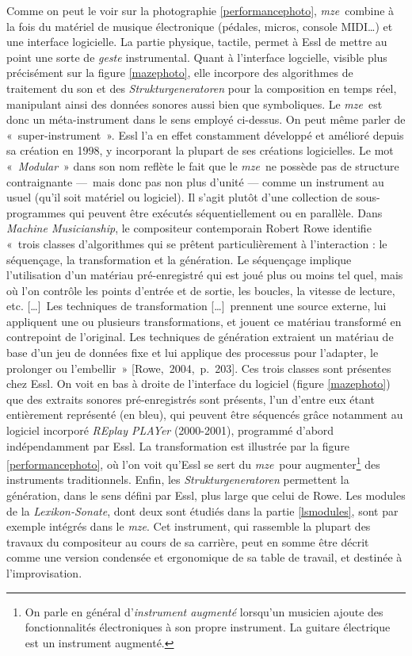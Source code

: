 \documentclass[a4paper,12pt]{article}
\newcommand{\guill}[1]{«~#1~»}
\newcommand{\maze}[0]{\emph{m\symbol{64}ze\textdegree2}}
\newcommand{\tpp}[0]{[\dots]}
\newcommand{\cicite}[1]{{\footnotesize[#1]}}
\begin{document}
Comme on peut le voir sur la photographie \ref{performancephoto}, \maze~combine à la fois du matériel de musique électronique (pédales, micros, console MIDI\dots) et une interface logicielle. La partie physique, tactile, permet à Essl de mettre au point une sorte de \emph{geste} instrumental. Quant à l'interface logcielle, visible plus précisément sur la figure \ref{mazephoto}, elle incorpore des algorithmes de traitement du son et des \emph{Strukturgeneratoren} pour la composition en temps réel, manipulant ainsi des données sonores aussi bien que symboliques. Le \maze~est donc un méta-instrument dans le sens employé ci-dessus. On peut même parler de \guill{super-instrument}. Essl l'a en effet constamment développé et amélioré depuis sa création en 1998, y incorporant la plupart de ses créations logicielles. Le mot \guill{\emph{Modular}} dans son nom reflète le fait que le \maze~ne possède pas de structure contraignante ---~mais donc pas non plus d'unité --- comme un instrument au usuel (qu'il soit matériel ou logiciel). Il s'agit plutôt d'une collection de sous-programmes qui peuvent être exécutés séquentiellement ou en parallèle. Dans \emph{Machine Musicianship}, le compositeur contemporain Robert Rowe identifie \guill{trois classes d'algorithmes qui se prêtent particulièrement à l'interaction : le séquençage, la transformation et la génération. Le séquençage implique l'utilisation d'un matériau pré-enregistré qui est joué plus ou moins tel quel, mais où l'on contrôle les points d'entrée et de sortie, les boucles, la vitesse de lecture, etc. \tpp~Les techniques de transformation \tpp~prennent une source externe, lui appliquent une ou plusieurs transformations, et jouent ce matériau transformé en contrepoint de l'original. Les techniques de génération extraient un matériau de base d'un jeu de données fixe et lui applique des processus pour l'adapter, le prolonger ou l'embellir} \cicite{Rowe,~2004,~p.~203}. Ces trois classes sont présentes chez Essl. On voit en bas à droite de l'interface du logiciel (figure \ref{mazephoto}) que des extraits sonores pré-enregistrés sont présents, l'un d'entre eux étant entièrement représenté (en bleu), qui peuvent être séquencés grâce notamment au logiciel incorporé \emph{REplay PLAYer} (2000-2001), programmé d'abord indépendamment par Essl. La transformation est illustrée par la figure \ref{performancephoto}, où l'on voit qu'Essl se sert du \maze~pour augmenter\footnote{On parle en général d'\emph{instrument augmenté} lorsqu'un musicien ajoute des fonctionnalités électroniques à son propre instrument. La guitare électrique est un instrument augmenté.} des instruments traditionnels. Enfin, les \emph{Strukturgeneratoren} permettent la génération, dans le sens défini par Essl, plus large que celui de Rowe. Les modules de la \emph{Lexikon-Sonate}, dont deux sont étudiés dans la partie \ref{lsmodules}, sont par exemple intégrés dans le \maze. Cet instrument, qui rassemble la plupart des travaux du compositeur au cours de sa carrière, peut en somme être décrit comme une version condensée et ergonomique de sa table de travail, et destinée à l'improvisation.
\end{document}
